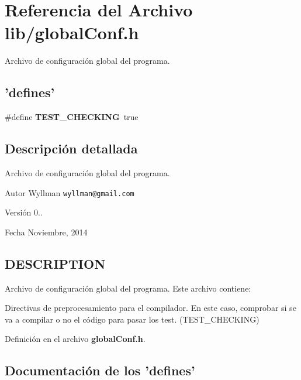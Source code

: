 \section{Referencia del Archivo lib/global\+Conf.h}
\label{global_conf_8h}


Archivo de configuración global del programa.  


\subsection*{'defines'}
\begin{DoxyCompactItemize}
\item 
\#define {\bf T\+E\+S\+T\+\_\+\+C\+H\+E\+C\+K\+I\+N\+G}~true
\end{DoxyCompactItemize}


\subsection{Descripción detallada}
Archivo de configuración global del programa. 

\begin{DoxyAuthor}{Autor}
Wyllman {\tt wyllman@gmail.\+com} 
\end{DoxyAuthor}
\begin{DoxyVersion}{Versión}
0.. 
\end{DoxyVersion}
\begin{DoxyDate}{Fecha}
Noviembre, 2014 
\end{DoxyDate}
\subsection{D\+E\+S\+C\+R\+I\+P\+T\+I\+O\+N}\label{main_8cpp_DESCRIPTION}
Archivo de configuración global del programa. Este archivo contiene\+:
\begin{DoxyItemize}
\item Directivas de preprocesamiento para el compilador. En este caso, comprobar si se va a compilar o no el código para pasar los test. (T\+E\+S\+T\+\_\+\+C\+H\+E\+C\+K\+I\+N\+G) 
\end{DoxyItemize}

Definición en el archivo {\bf global\+Conf.\+h}.



\subsection{Documentación de los 'defines'}
